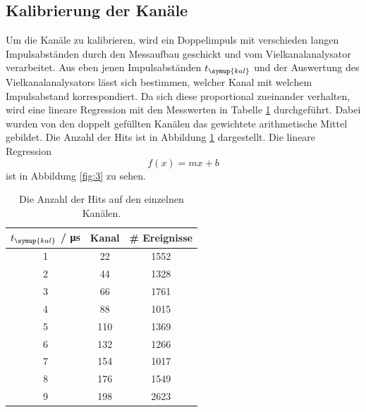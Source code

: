 \documentclass[
  bibliography=totoc,     %
  captions=tableheading,  %
  titlepage=firstiscover, %
]{scrartcl}
\begin{document}
\subsection{Kalibrierung der Kanäle}
\label{sec:kal}
Um die Kanäle zu kalibrieren, wird ein Doppelimpuls mit verschieden langen Impulsabständen
durch den Messaufbau geschickt und vom Vielkanalanalysator verarbeitet. Aus eben jenen
Impulsabständen $t_{\symup{kal}}$ und der Auswertung des Vielkanalanalysators lässt sich bestimmen, welcher
Kanal mit welchem Impulsabstand korrespondiert. Da sich diese proportional zueinander
verhalten, wird eine lineare Regression mit den Messwerten in Tabelle \ref{tab:2}
durchgeführt. Dabei wurden von den doppelt gefüllten Kanälen das gewichtete
arithmetische Mittel gebildet. Die Anzahl der Hits ist in Abbildung \ref{tab:2}
dargestellt.
Die lineare Regression
\begin{equation*}
  f(x) = mx + b
\end{equation*}
ist in Abbildung \ref{fig:3} zu sehen.

\begin{table}[H]
\centering
\begin{tabular}{c c c}
  \toprule
  $t_{\symup{kal}}$ / \si{\micro\second} & Kanal & \# Ereignisse \\
  \midrule
  1 & 22 & 1552 \\
  2 & 44 & 1328 \\
  3 & 66 & 1761 \\
  4 & 88 & 1015 \\
  5 & 110 & 1369 \\
  6 & 132 & 1266 \\
  7 & 154 & 1017 \\
  8 & 176 & 1549 \\
  9 & 198 & 2623 \\
  \bottomrule
\end{tabular}
  \caption{Die Anzahl der Hits auf den einzelnen Kanälen.}
  \label{tab:2}
\end{table}
\end{document}
